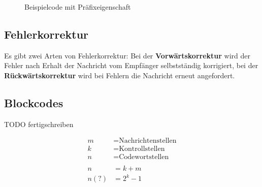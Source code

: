 \begin{figure}[H]
	\caption{Beispielcode mit Präfixeigenschaft}
\end{figure}


\subsection{Fehlerkorrektur}

Es gibt zwei Arten von Fehlerkorrektur: Bei der \textbf{Vorwärtskorrektur} wird
der Fehler nach Erhalt der Nachricht vom Empfänger selbstständig korrigiert, bei
der \textbf{Rückwärtskorrektur} wird bei Fehlern die Nachricht erneut
angefordert.


\subsection{Blockcodes}

TODO fertigschreiben

\begin{align*}
	m &= \textrm{Nachrichtenstellen} \\
	k &= \textrm{Kontrollstellen} \\
	n &= \textrm{Codewortstellen} \\
	\\
	n &= k + m \\
	n(?) &= 2^k - 1
\end{align*}
